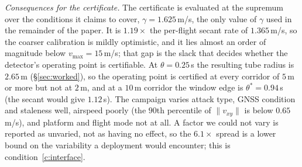 \documentclass[conference,letterpaper,10pt]{IEEEtran}   %
\newcommand{\code}[1]{\texttt{#1}}
\begin{document}
\begin{table}[t]
\centering
\caption{Per-flight rates $\gamma$: the coarse calibration obtained from a
single scalar per flight. The $2.6\times$ spread across attack types is visible
here; the finer structure requires Table~\ref{tab:gammacamp}. Generated by
\code{experiments/gamma\_stability.py}.}
\label{tab:gamma}
\small
\renewcommand{\arraystretch}{1.05}

\end{table}

\emph{Consequences for the certificate.} The certificate is evaluated at the
supremum over the conditions it claims to cover, $\gamma=1.625$\,m/s, the only
value of $\gamma$ used in the remainder of the paper. It is $1.19\times$ the
per-flight secant rate of $1.365$\,m/s, so the coarser calibration is mildly
optimistic, and it lies almost an order of magnitude below
$v_{\max}=15$\,m/s; that gap is the slack that decides whether the detector's
operating point is certifiable. At $\theta=0.25$\,s the resulting tube radius is
$2.65$\,m (\S\ref{sec:worked}), so the operating point is certified at every
corridor of $5$\,m or more but not at $2$\,m, and at a $10$\,m corridor the
window edge is $\theta^{*}=0.94$\,s (the secant would give $1.12$\,s). The
campaign varies attack type, GNSS condition and staleness well, airspeed poorly
(the $90$th percentile of $\lVert v_{xy}\rVert$ is below $0.65$\,m/s), and
platform and flight mode not at all. A factor we could not vary is reported as
unvaried, not as having no effect, so the $6.1\times$ spread is a lower bound
on the variability a deployment would encounter; this is
condition~\ref{c:interface}.
\end{document}
